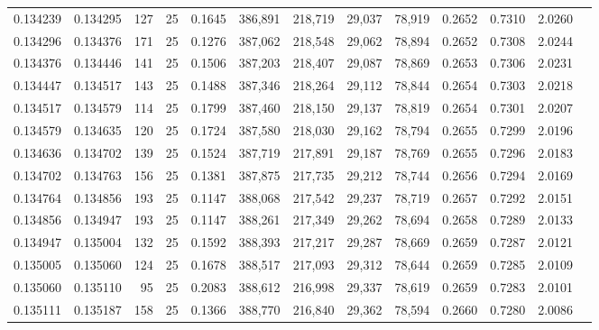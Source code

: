 \begin{tabular}{rrrrrrrrrrrrr}
0.134239 & 0.134295 &   127 &  25 &                                     0.1645 & 386,891 & 218,719 &  29,037 &  78,919 & 0.2652 & 0.7310 & 2.0260 \\
0.134296 & 0.134376 &   171 &  25 &                                     0.1276 & 387,062 & 218,548 &  29,062 &  78,894 & 0.2652 & 0.7308 & 2.0244 \\
0.134376 & 0.134446 &   141 &  25 &                                     0.1506 & 387,203 & 218,407 &  29,087 &  78,869 & 0.2653 & 0.7306 & 2.0231 \\
0.134447 & 0.134517 &   143 &  25 &                                     0.1488 & 387,346 & 218,264 &  29,112 &  78,844 & 0.2654 & 0.7303 & 2.0218 \\
0.134517 & 0.134579 &   114 &  25 &                                     0.1799 & 387,460 & 218,150 &  29,137 &  78,819 & 0.2654 & 0.7301 & 2.0207 \\
0.134579 & 0.134635 &   120 &  25 &                                     0.1724 & 387,580 & 218,030 &  29,162 &  78,794 & 0.2655 & 0.7299 & 2.0196 \\
0.134636 & 0.134702 &   139 &  25 &                                     0.1524 & 387,719 & 217,891 &  29,187 &  78,769 & 0.2655 & 0.7296 & 2.0183 \\
0.134702 & 0.134763 &   156 &  25 &                                     0.1381 & 387,875 & 217,735 &  29,212 &  78,744 & 0.2656 & 0.7294 & 2.0169 \\
0.134764 & 0.134856 &   193 &  25 &                                     0.1147 & 388,068 & 217,542 &  29,237 &  78,719 & 0.2657 & 0.7292 & 2.0151 \\
0.134856 & 0.134947 &   193 &  25 &                                     0.1147 & 388,261 & 217,349 &  29,262 &  78,694 & 0.2658 & 0.7289 & 2.0133 \\
0.134947 & 0.135004 &   132 &  25 &                                     0.1592 & 388,393 & 217,217 &  29,287 &  78,669 & 0.2659 & 0.7287 & 2.0121 \\
0.135005 & 0.135060 &   124 &  25 &                                     0.1678 & 388,517 & 217,093 &  29,312 &  78,644 & 0.2659 & 0.7285 & 2.0109 \\
0.135060 & 0.135110 &    95 &  25 &                                     0.2083 & 388,612 & 216,998 &  29,337 &  78,619 & 0.2659 & 0.7283 & 2.0101 \\
0.135111 & 0.135187 &   158 &  25 &                                     0.1366 & 388,770 & 216,840 &  29,362 &  78,594 & 0.2660 & 0.7280 & 2.0086 \\

\end{tabular}
